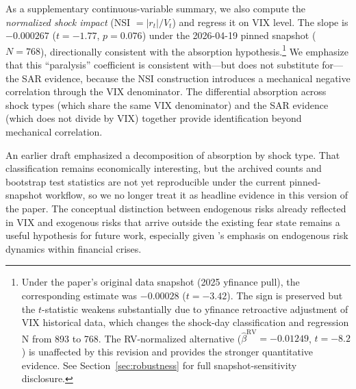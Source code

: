 \documentclass[12pt,a4paper]{article}
\begin{document}
As a supplementary continuous-variable summary, we also compute the \textit{normalized shock impact} (NSI $= |r_t|/V_t$) and regress it on VIX level. The slope is $-0.000267$ ($t = -1.77$, $p = 0.076$) under the 2026-04-19 pinned snapshot ($N = 768$), directionally consistent with the absorption hypothesis.\footnote{Under the paper's original data snapshot (2025 yfinance pull), the corresponding estimate was $-0.00028$ ($t = -3.42$). The sign is preserved but the $t$-statistic weakens substantially due to yfinance retroactive adjustment of VIX historical data, which changes the shock-day classification and regression N from 893 to 768. The RV-normalized alternative ($\hat{\beta}^{\text{RV}} = -0.01249$, $t = -8.2$) is unaffected by this revision and provides the stronger quantitative evidence. See Section~\ref{sec:robustness} for full snapshot-sensitivity disclosure.} We emphasize that this ``paralysis'' coefficient is consistent with---but does not substitute for---the SAR evidence, because the NSI construction introduces a mechanical negative correlation through the VIX denominator. The differential absorption across shock types (which share the same VIX denominator) and the SAR evidence (which does not divide by VIX) together provide identification beyond mechanical correlation.

An earlier draft emphasized a decomposition of absorption by shock type. That classification remains economically interesting, but the archived counts and bootstrap test statistics are not yet reproducible under the current pinned-snapshot workflow, so we no longer treat it as headline evidence in this version of the paper. The conceptual distinction between endogenous risks already reflected in VIX and exogenous risks that arrive outside the existing fear state remains a useful hypothesis for future work, especially given \citet{danielsson2018}'s emphasis on endogenous risk dynamics within financial crises.
\end{document}
